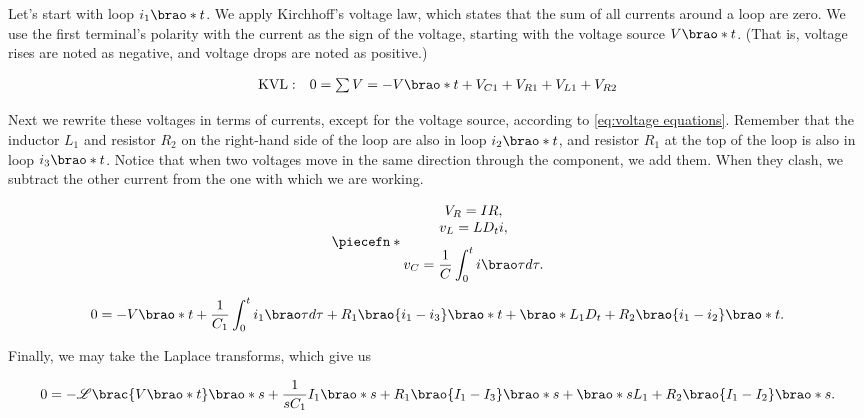 \documentclass[12pt]{article}
\DeclarePairedDelimiter\brao()%
\DeclarePairedDelimiter\brac[]%
\DeclarePairedDelimiter\piecefn\{.
\begin{document}
Let's start with loop $i_1\brao*t$.
We apply Kirchhoff's voltage law, which states that the sum of all currents around a loop are zero. 
We use the first terminal's polarity with the current as the sign of the voltage, starting with the voltage source $V\brao*t$. (That is, voltage rises are noted as negative, and voltage drops are noted as positive.)

\begin{equation}
    \begin{array}{@{}ll@{}}
        \operatorname{KVL}: & 0 = \sum V = -V\brao*t + V_{C1} + V_{R1} + V_{L1} + V_{R2}
    \end{array}
\end{equation}

Next we rewrite these voltages in terms of currents, except for the voltage source, according to \ref{eq:voltage equations}.
Remember that the inductor $L_1$ and resistor $R_2$ on the right-hand side of the loop are also in loop $i_2\brao*t$, and resistor $R_1$ at the top of the loop is also in loop $i_3\brao*t$.
Notice that when two voltages move in the same direction through the component, we add them. When they clash, we subtract the other current from the one with which we are working.

\begin{equation}\label{eq:voltage equations}
    \piecefn*{
        \begin{matrix}        
            V_R = IR,
        \\*
            v_L = L D_t i,
        \\*[0.75em]
            v_C = \dfrac1C \displaystyle\int_0^t i\brao\tau d\tau.
        \\*
        \end{matrix}
    }
\end{equation}

\begin{equation}
    0 = -V\brao*t + \dfrac1{C_1} \displaystyle\int_0^t i_1\brao\tau d\tau + R_1 \brao{i_1 - i_3}\brao*t + \brao*{L_1 D_t +  R_2}\brao{i_1 - i_2}\brao*t.
\end{equation}

Finally, we may take the Laplace transforms, which give us

\begin{equation}
    0 = -\mathscr{L}\brac{V\brao*t}\brao*s + \frac1{sC_1} I_1\brao*s + R_1 \brao{I_1 - I_3}\brao*s + \brao*{sL_1 + R_2}\brao{I_1 - I_2}\brao*s.
\end{equation}
\end{document}
